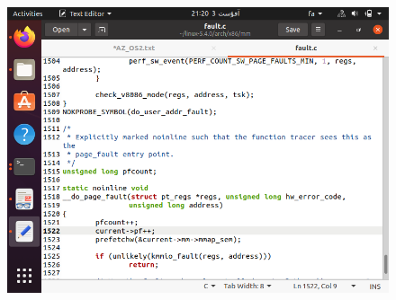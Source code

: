 \begin{itemize}
\begin{enumerate}
\begin{figure}[!hpbt]
 				\centering
 				\includegraphics[scale=0.4]{img/pic7.png}
 			\end{figure}
 			

\end{enumerate}
\end{itemize}

